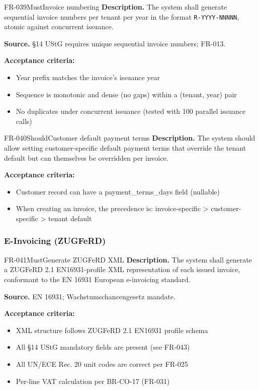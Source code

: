 \documentclass[11pt,a4paper]{article}
\begin{document}
\begin{requirement}{FR-039}{Must}{Invoice numbering}
\textbf{Description.} The system shall generate sequential invoice numbers per tenant per year in the format \texttt{R-YYYY-NNNNN}, atomic against concurrent issuance.

\textbf{Source.} \S14 UStG requires unique sequential invoice numbers; FR-013.

\textbf{Acceptance criteria:}
\begin{itemize}
    \item Year prefix matches the invoice's issuance year
    \item Sequence is monotonic and dense (no gaps) within a (tenant, year) pair
    \item No duplicates under concurrent issuance (tested with 100 parallel issuance calls)
\end{itemize}
\end{requirement}

\begin{requirement}{FR-040}{Should}{Customer default payment terms}
\textbf{Description.} The system should allow setting customer-specific default payment terms that override the tenant default but can themselves be overridden per invoice.

\textbf{Acceptance criteria:}
\begin{itemize}
    \item Customer record can have a payment\_terms\_days field (nullable)
    \item When creating an invoice, the precedence is: invoice-specific > customer-specific > tenant default
\end{itemize}
\end{requirement}

\subsubsection{E-Invoicing (ZUGFeRD)}

\begin{requirement}{FR-041}{Must}{Generate ZUGFeRD XML}
\textbf{Description.} The system shall generate a ZUGFeRD 2.1 EN16931-profile XML representation of each issued invoice, conformant to the EN 16931 European e-invoicing standard.

\textbf{Source.} EN 16931; Wachstumschancengesetz mandate.

\textbf{Acceptance criteria:}
\begin{itemize}
    \item XML structure follows ZUGFeRD 2.1 EN16931 profile schema
    \item All \S14 UStG mandatory fields are present (see FR-043)
    \item All UN/ECE Rec. 20 unit codes are correct per FR-025
    \item Per-line VAT calculation per BR-CO-17 (FR-031)
\end{itemize}
\end{requirement}
\end{document}
